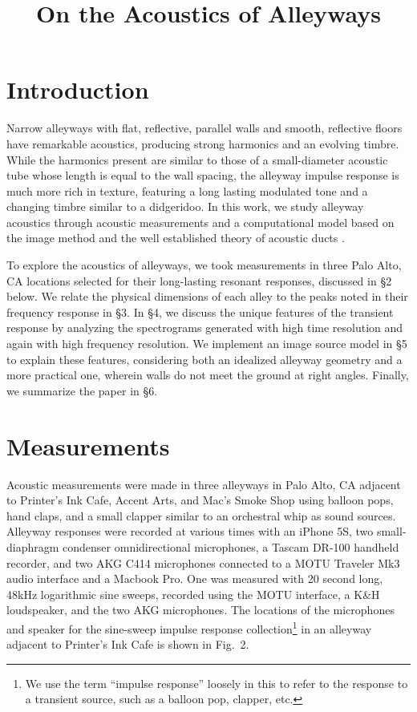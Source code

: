 \documentclass{aes137}
\affiliation[1]{Center for Computer Research in Music and Acoustics, Department of Music, Stanford University, Stanford, CA 94305 USA}
\affiliation[2]{Applied Research Laboratories and Department of Mechanical Engineering, The University of Texas at Austin, Austin, TX, USA.}
\title{}
\title{On the Acoustics of Alleyways}
\begin{document}
\maketitle %

\section{Introduction}

Narrow alleyways with flat, reflective, parallel walls and smooth,
reflective floors have remarkable acoustics, producing strong
harmonics and an evolving timbre. While the harmonics present are
similar to those of a small-diameter acoustic tube whose length is
equal to the wall spacing, the alleyway impulse response is much more
rich in texture, featuring a long lasting modulated tone and a
changing timbre similar to a didgeridoo. In this work, we study alleyway
acoustics through acoustic measurements and a computational model
based on the image method \cite{Allen,Borish} and the well established
theory of acoustic ducts \cite{Morse}.

To explore the acoustics of alleyways, we took measurements in three Palo Alto, CA locations selected for their long-lasting resonant responses, discussed in \S2 below. We relate the physical dimensions of each alley to the peaks noted in their frequency response in \S3. In \S4, we discuss the unique features of the transient response by analyzing the spectrograms generated with high time resolution and again with high frequency resolution. We implement an image source model in \S5 to explain these features, considering both an idealized alleyway geometry and a more practical one, wherein walls do not meet the ground at right angles. Finally, we summarize the paper in \S6. %


\section{Measurements}

Acoustic measurements were made in three alleyways in Palo Alto, CA adjacent to Printer's Ink Cafe, Accent Arts, and Mac's Smoke Shop
using balloon pops, hand claps, and a small clapper similar to an
orchestral whip as sound sources. Alleyway responses were recorded at various times with an iPhone 5S, two small-diaphragm condenser omnidirectional microphones, a Tascam DR-100 handheld recorder, and two AKG C414 microphones connected to a MOTU Traveler Mk3 audio interface and a Macbook Pro. One was measured with 20 second long, 48kHz logarithmic sine sweeps, recorded using the MOTU interface, a K\&H loudspeaker, and the two AKG microphones. The locations of the microphones and speaker for the sine-sweep impulse response collection\footnote{We use the term
``impulse response'' loosely in this to refer to the response to a transient source, such as a balloon pop, clapper, etc.} in an alleyway adjacent to
Printer's Ink Cafe is shown in Fig.~2.
\end{document}
